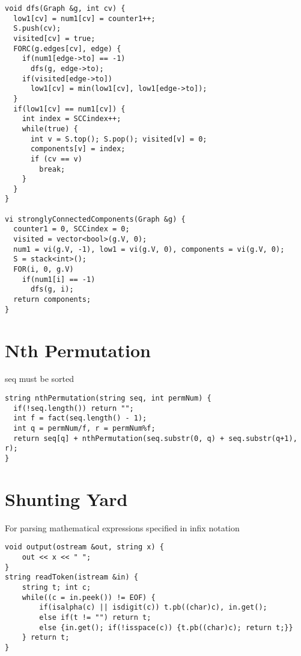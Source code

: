 \documentclass[8pt, oneside]{extarticle}
\begin{document}
\begin{multicols}{3}
\begin{lstlisting}
void dfs(Graph &g, int cv) {
  low1[cv] = num1[cv] = counter1++;
  S.push(cv);
  visited[cv] = true;
  FORC(g.edges[cv], edge) {
    if(num1[edge->to] == -1)
      dfs(g, edge->to);
    if(visited[edge->to])
      low1[cv] = min(low1[cv], low1[edge->to]);        
  }
  if(low1[cv] == num1[cv]) {
    int index = SCCindex++;
    while(true) {
      int v = S.top(); S.pop(); visited[v] = 0;
      components[v] = index;
      if (cv == v)
        break;
    }
  }
}

vi stronglyConnectedComponents(Graph &g) {
  counter1 = 0, SCCindex = 0;
  visited = vector<bool>(g.V, 0);
  num1 = vi(g.V, -1), low1 = vi(g.V, 0), components = vi(g.V, 0);
  S = stack<int>();
  FOR(i, 0, g.V)
    if(num1[i] == -1)
      dfs(g, i);
  return components;
}
\end{lstlisting}

\section{Nth Permutation}
seq must be sorted
\begin{lstlisting}
string nthPermutation(string seq, int permNum) {
  if(!seq.length()) return "";
  int f = fact(seq.length() - 1);
  int q = permNum/f, r = permNum%f;
  return seq[q] + nthPermutation(seq.substr(0, q) + seq.substr(q+1), r);
}
\end{lstlisting}

\section{Shunting Yard}
 For parsing mathematical expressions specified in infix notation
\begin{lstlisting}
void output(ostream &out, string x) {
    out << x << " ";
}
string readToken(istream &in) {
    string t; int c;
    while((c = in.peek()) != EOF) {
        if(isalpha(c) || isdigit(c)) t.pb((char)c), in.get();
        else if(t != "") return t;
        else {in.get(); if(!isspace(c)) {t.pb((char)c); return t;}}
    } return t;
}


\end{lstlisting}
\end{multicols}
\end{document}
